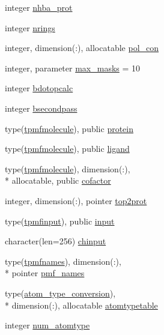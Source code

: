 \begin{DoxyCompactItemize}
\item 
integer \hyperlink{classcalc__pmf_a8581bffe627bc8ed70f44137b5f42858}{nhba\-\_\-prot}
\item 
integer \hyperlink{classcalc__pmf_a9c8caec9fe50efcc18091801d76510eb}{nrings}
\item 
integer, dimension(\-:), allocatable \hyperlink{classcalc__pmf_ae6bac7e8dc202b26e4acf6142e650da7}{pol\-\_\-con}
\item 
integer, parameter \hyperlink{classcalc__pmf_acf38a9791fdd978de8bdec1e59e0b164}{max\-\_\-masks} = 10
\item 
integer \hyperlink{classcalc__pmf_a6fc1809ea11117a2dcb3b452e1b6b2cc}{bdotopcalc}
\item 
integer \hyperlink{classcalc__pmf_a690cfd14223de22b294b928d0e9e2080}{bsecondpass}
\item 
type(\hyperlink{structcalc__pmf_1_1tpmfmolecule}{tpmfmolecule}), public \hyperlink{classcalc__pmf_aafcf4af6240191b24adac7de7d51fa0d}{protein}
\item 
type(\hyperlink{structcalc__pmf_1_1tpmfmolecule}{tpmfmolecule}), public \hyperlink{classcalc__pmf_adb3a353d55dd9c86c7a56dfec5bfef05}{ligand}
\item 
type(\hyperlink{structcalc__pmf_1_1tpmfmolecule}{tpmfmolecule}), dimension(\-:), \\*
allocatable, public \hyperlink{classcalc__pmf_a3e437b5cee4494c9a9445956c7b996fe}{cofactor}
\item 
integer, dimension(\-:), pointer \hyperlink{classcalc__pmf_abf00c9b4eae4e83c041e4b4b732672de}{top2prot}
\item 
type(\hyperlink{structcalc__pmf_1_1tpmfinput}{tpmfinput}), public \hyperlink{classcalc__pmf_a05d3af4e1c76e5ab7f299b7db6d74cac}{input}
\item 
character(len=256) \hyperlink{classcalc__pmf_a2c7ec15e30c13d5d1cb9ad5727b025a9}{chinput}
\item 
type(\hyperlink{structcalc__pmf_1_1tpmfnames}{tpmfnames}), dimension(\-:), \\*
pointer \hyperlink{classcalc__pmf_a78c8b146350fd4608bf9e835d768a391}{pmf\-\_\-names}
\item 
type(\hyperlink{structcalc__pmf_1_1atom__type__conversion}{atom\-\_\-type\-\_\-conversion}), \\*
dimension(\-:), allocatable \hyperlink{classcalc__pmf_aaea67c47132371b0b4ee5dc74d16f778}{atomtypetable}
\item 
integer \hyperlink{classcalc__pmf_a560b5dea51180db59cce9c3106ebc977}{num\-\_\-atomtype}

\end{DoxyCompactItemize}
